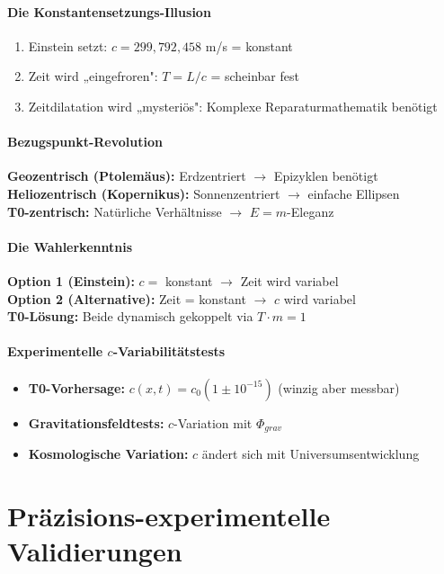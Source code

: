 \documentclass[12pt,a4paper]{report}
\begin{document}
	\subsubsection{Die Konstantensetzungs-Illusion}
	\begin{enumerate}
		\item Einstein setzt: $c = 299{,}792{,}458$ m/s = konstant
		\item Zeit wird „eingefroren": $T = L/c$ = scheinbar fest
		\item Zeitdilatation wird „mysteriös": Komplexe Reparaturmathematik benötigt
	\end{enumerate}
	
	\subsubsection{Bezugspunkt-Revolution}
	\textbf{Geozentrisch (Ptolemäus):} Erdzentriert $\rightarrow$ Epizyklen benötigt\\
	\textbf{Heliozentrisch (Kopernikus):} Sonnenzentriert $\rightarrow$ einfache Ellipsen\\
	\textbf{T0-zentrisch:} Natürliche Verhältnisse $\rightarrow$ $E = m$-Eleganz
	
	\subsubsection{Die Wahlerkenntnis}
	\textbf{Option 1 (Einstein):} $c =$ konstant $\rightarrow$ Zeit wird variabel\\
	\textbf{Option 2 (Alternative):} Zeit = konstant $\rightarrow$ $c$ wird variabel\\
	\textbf{T0-Lösung:} Beide dynamisch gekoppelt via $T \cdot m = 1$
	
	\subsubsection{Experimentelle $c$-Variabilitätstests}
	\begin{itemize}
		\item \textbf{T0-Vorhersage:} $c(x,t) = c_0(1 \pm 10^{-15})$ (winzig aber messbar)
		\item \textbf{Gravitationsfeldtests:} $c$-Variation mit $\Phi_{grav}$
		\item \textbf{Kosmologische Variation:} $c$ ändert sich mit Universumsentwicklung
	\end{itemize}
	
	\chapter{Präzisions-experimentelle Validierungen}
	
\end{document}
